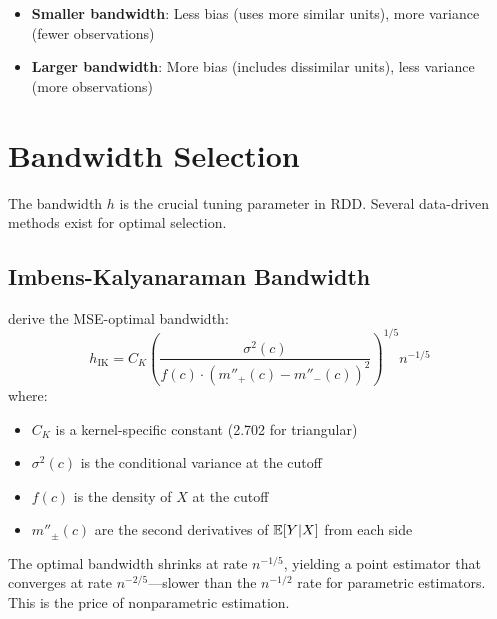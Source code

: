 \begin{itemize}
    \item \textbf{Smaller bandwidth}: Less bias (uses more similar units), more variance (fewer observations)
    \item \textbf{Larger bandwidth}: More bias (includes dissimilar units), less variance (more observations)
\end{itemize}

\section{Bandwidth Selection}
\label{sec:rdd_bandwidth}

The bandwidth $h$ is the crucial tuning parameter in RDD. Several data-driven methods exist for optimal selection.

\subsection{Imbens-Kalyanaraman Bandwidth}

\begin{definition}
\label{def:ik_bandwidth}
\citet{imbens2012optimal} derive the MSE-optimal bandwidth:
\begin{equation}
    h_{\text{IK}} = C_K \left(\frac{\sigma^2(c)}{f(c) \cdot (m''_+(c) - m''_-(c))^2}\right)^{1/5} n^{-1/5}
    \label{eq:ik_bandwidth}
\end{equation}
where:
\begin{itemize}
    \item $C_K$ is a kernel-specific constant (2.702 for triangular)
    \item $\sigma^2(c)$ is the conditional variance at the cutoff
    \item $f(c)$ is the density of $X$ at the cutoff
    \item $m''_\pm(c)$ are the second derivatives of $\mathbb{E}[Y|X]$ from each side
\end{itemize}
\end{definition}

\begin{remark}
The optimal bandwidth shrinks at rate $n^{-1/5}$, yielding a point estimator that converges at rate $n^{-2/5}$---slower than the $n^{-1/2}$ rate for parametric estimators. This is the price of nonparametric estimation.
\end{remark}

